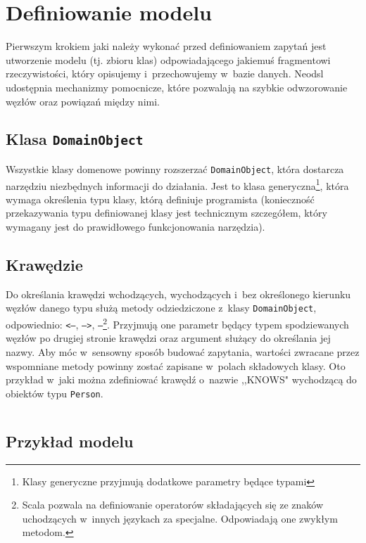 \documentclass[brudnopis]{xmgr}
\begin{document}
\section{Definiowanie modelu}

Pierwszym krokiem jaki należy wykonać przed definiowaniem zapytań jest utworzenie modelu (tj. zbioru klas) odpowiadającego jakiemuś fragmentowi rzeczywistości, który opisujemy i~przechowujemy w~bazie danych. Neodsl udostępnia mechanizmy pomocnicze, które pozwalają na szybkie odwzorowanie węzłów oraz powiązań między nimi.

\subsection{Klasa \texttt{DomainObject}}

Wszystkie klasy domenowe powinny rozszerzać \texttt{DomainObject}, która dostarcza narzędziu niezbędnych informacji do działania. Jest to klasa generyczna\footnote{Klasy generyczne  przyjmują dodatkowe parametry będące typami}, która wymaga określenia typu klasy, którą definiuje programista (konieczność przekazywania typu definiowanej klasy jest technicznym szczegółem, który wymagany jest do prawidłowego funkcjonowania narzędzia). 

\subsection{Krawędzie}

Do określania krawędzi wchodzących, wychodzących i~bez określonego kierunku węzłów danego typu służą metody odziedziczone z~klasy \texttt{DomainObject}, odpowiednio:  \texttt{<--}, \texttt{-->}, \texttt{--}\footnote{Scala pozwala na definiowanie operatorów składających się ze znaków uchodzących w~innych językach za specjalne. Odpowiadają one zwykłym metodom.}. Przyjmują one parametr będący typem spodziewanych węzłów po drugiej stronie krawędzi oraz argument służący do określania jej nazwy. Aby móc w~sensowny sposób budować zapytania, wartości zwracane przez wspomniane metody powinny zostać zapisane w~polach składowych klasy. Oto przykład w~jaki można zdefiniować krawędź o~nazwie ,,KNOWS" wychodzącą do obiektów typu \texttt{Person}.

\inputminted{scala}{listings/scala/dsl/simple-relation.scala}

\subsection{Przykład modelu}
\end{document}
